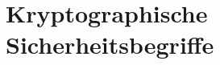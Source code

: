 \section{Kryptographische Sicherheitsbegriffe}%
\label{kseb:sec:kryptographische_sicherheitsbegriffe}
